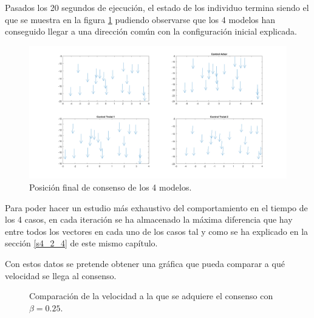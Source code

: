Pasados los 20 segundos de ejecución, el estado de los individuo termina siendo el que se muestra en la figura \ref{fig:pos_final_4models} pudiendo observarse que los 4 modelos han conseguido llegar a una dirección común con la configuración inicial explicada.

\begin{figure}[h!]
    \centering
    \includegraphics[width=\textwidth]{fig/cap04/3ALLB025/pos_final.png}
    \caption{Posición final de consenso de los 4 modelos.}
    \label{fig:pos_final_4models}
\end{figure}

Para poder hacer un estudio más exhaustivo del comportamiento en el tiempo de los 4 casos, en cada iteración se ha almacenado la máxima diferencia que hay entre todos los vectores en cada uno de los casos tal y como se ha explicado en la sección \ref{s4_2_4} de este mismo capítulo. 

Con estos datos se pretende obtener una gráfica que pueda comparar a qué velocidad se llega al consenso.

\begin{figure}[htbp]
\centering
\caption{Comparación de la velocidad a la que se adquiere el consenso con $\beta = 0.25$.} 
\label{fig:consenso_4models}
\end{figure}

